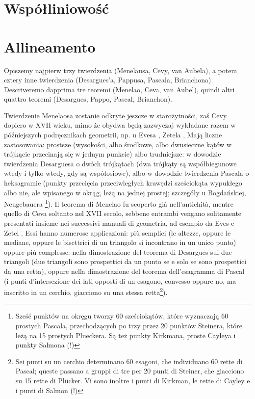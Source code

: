 
%

\chapter{Współliniowość} %
\chapter{Allineamento} %

Opiszemy najpierw trzy twierdzenia (Menelausa, Cevy, van Aubela), a potem cztery inne twierdzenia (Desargues'a, Pappusa, Pascala, Brianchona). %
Descriveremo dapprima tre teoremi (Menelao, Ceva, van Aubel), quindi altri quattro teoremi (Desargues, Pappo, Pascal, Brianchon). %

Twierdzenie Menelaosa zostanie odkryte jeszcze w starożytności, zaś Cevy dopiero w XVII wieku, mimo że obydwa będą zazwyczaj wykładane razem w późniejszych podręcznikach geometrii, np. u Evesa \cite[s. 63-67]{eves1_1972}, Zetela \cite[s. 13, 43]{zetel_2020}, %
Mają liczne zastosowania: %
prostsze (wysokości, albo środkowe, albo dwusieczne kątów w trójkącie przecinają się w jednym punkcie) albo trudniejsze: %
w dowodzie twierdzenia Desarguesa o dwóch trójkątach (dwa trójkąty są współbiegunowe wtedy i tylko wtedy, gdy są współosiowe), %
albo w dowodzie twierdzenia Pascala o heksagramie (punkty przecięcia przeciwległych krawędzi sześciokąta wypukłego albo nie, ale wpisanego w okrąg, leżą na jednej prostej; szczegóły u Bogdańskiej, Neugebauera \cite[s. 113]{neugebauer_2018}\footnote{Sześć punktów na okręgu tworzy 60 sześciokątów, które wyznaczają 60 prostych Pascala, przechodzących po trzy przez 20 punktów Steinera, które leżą na 15 prostych Plueckera. Są też punkty Kirkmana, proste Cayleya i punkty Salmona (!)}). %
Il teorema di Menelao fu scoperto già nell'antichità, mentre quello di Ceva soltanto nel XVII secolo, sebbene entrambi vengano solitamente presentati insieme nei successivi manuali di geometria, ad esempio da Eves \cite[pp. 63-67]{eves1_1972} e Zetel \cite[pp. 13, 43]{zetel_2020}. %
Essi hanno numerose applicazioni: %
più semplici (le altezze, oppure le mediane, oppure le bisettrici di un triangolo si incontrano in un unico punto) oppure più complesse: %
nella dimostrazione del teorema di Desargues sui due triangoli (due triangoli sono prospettici da un punto se e solo se sono prospettici da una retta), %
oppure nella dimostrazione del teorema dell'esagramma di Pascal (i punti d'intersezione dei lati opposti di un esagono, convesso oppure no, ma inscritto in un cerchio, giacciono su una stessa retta\footnote{Sei punti su un cerchio determinano 60 esagoni, che individuano 60 rette di Pascal; queste passano a gruppi di tre per 20 punti di Steiner, che giacciono su 15 rette di Plücker. Vi sono inoltre i punti di Kirkman, le rette di Cayley e i punti di Salmon (!)}). %

